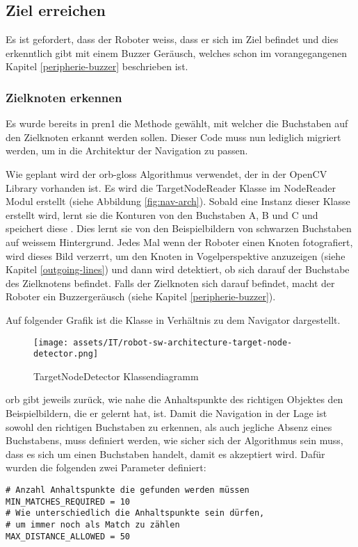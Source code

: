 \subsection{Ziel erreichen}

Es ist gefordert, dass der Roboter weiss, dass er sich im Ziel befindet und dies erkenntlich gibt mit einem Buzzer Geräusch, welches schon im vorangegangenen Kapitel \ref{peripherie-buzzer} beschrieben ist.

\subsubsection{Zielknoten erkennen}
\label{detect-target}

Es wurde bereits in \acrshort{pren1} die Methode gewählt, mit welcher die Buchstaben auf den Zielknoten erkannt werden sollen. Dieser Code muss nun lediglich migriert werden, um in die Architektur der Navigation zu passen.

Wie geplant wird der \gls{orb-gloss} Algorithmus verwendet, der in der OpenCV Library vorhanden ist. Es wird die TargetNodeReader Klasse im NodeReader Modul erstellt (siehe Abbildung \ref{fig:nav-arch}). Sobald eine Instanz dieser Klasse erstellt wird, lernt sie die Konturen von den Buchstaben A, B und C und speichert diese .
Dies lernt sie von den Beispielbildern von schwarzen Buchstaben auf weissem Hintergrund.
Jedes Mal wenn der Roboter einen Knoten fotografiert, wird dieses Bild verzerrt, um den Knoten in Vogelperspektive anzuzeigen (siehe Kapitel \ref{outgoing-lines}) und dann wird detektiert, ob sich darauf der Buchstabe des Zielknotens befindet. Falls der Zielknoten sich darauf befindet, macht der Roboter ein Buzzergeräusch (siehe Kapitel \ref{peripherie-buzzer}).

Auf folgender Grafik ist die Klasse in Verhältnis zu dem Navigator dargestellt.

\begin{figure}[H]
\centering
\texttt{[image: assets/IT/robot-sw-architecture-target-node-detector.png]}
\caption{TargetNodeDetector Klassendiagramm}
\label{fig:target-node-nav}
\end{figure}

\acrshort{orb} gibt jeweils zurück, wie nahe die Anhaltspunkte des richtigen Objektes den Beispielbildern, die er gelernt hat, ist. Damit die Navigation in der Lage ist sowohl den richtigen Buchstaben zu erkennen, als auch jegliche Absenz eines Buchstabens, muss definiert werden, wie sicher sich der Algorithmus sein muss, dass es sich um einen Buchstaben handelt, damit es akzeptiert wird. Dafür wurden die folgenden zwei Parameter definiert:
\begin{verbatim}
# Anzahl Anhaltspunkte die gefunden werden müssen
MIN_MATCHES_REQUIRED = 10
# Wie unterschiedlich die Anhaltspunkte sein dürfen,
# um immer noch als Match zu zählen
MAX_DISTANCE_ALLOWED = 50
\end{verbatim}

